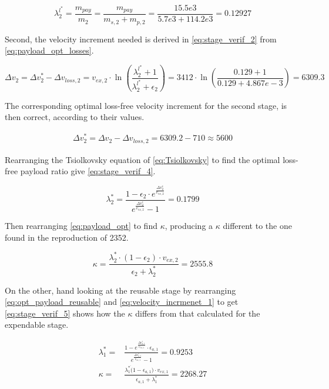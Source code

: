 \begin{equation}
    \lambda_2^{l^*} = \frac{m_{pay}}{m_2} = \frac{m_{pay}}{m_{s,2} + m_{p,2}} = \frac{15.5e3}{5.7e3 + 114.2e3} = 0.12927
\label{eq:stage_verif_1}
\end{equation}

Second, the velocity increment needed is derived in \autoref{eq:stage_verif_2} from \autoref{eq:payload_opt_losses}. 

\begin{equation}
    \Delta v_2 = \Delta v_2^* - \Delta v_{loss,2} = v_{ex,2} \cdot \ln(\frac{\lambda_2^{l^*}  + 1}{\lambda_2^{l^*}  + \epsilon_2}) = 3412 \cdot \ln(\frac{0.129 + 1}{0.129 + 4.867e-3}) = 6309.3
\label{eq:stage_verif_2}
\end{equation}

The corresponding optimal loss-free velocity increment for the second stage, is then correct, according to their values.

\begin{equation}
\begin{aligned}
    \Delta v_2^* =  \Delta v_2 - \Delta v_{loss,2} = 6309.2 - 710 \approx 5600
\end{aligned}
\label{eq:stage_verif_3}
\end{equation}

Rearranging the Tsiolkovsky equation of \autoref{eq:Tsiolkovsky} to find the optimal loss-free payload ratio give \autoref{eq:stage_verif_4}.

\begin{equation}
    \lambda_2^* = \frac{1 - \epsilon_2 \cdot e^{\frac{\Delta v^*_2}{v_{{ex,2}}}}}{e^{\frac{\Delta v^*_2}{v_{ex,2}}} - 1} = 0.1799
\label{eq:stage_verif_4}
\end{equation}

Then rearranging \autoref{eq:payload_opt} to find $\kappa$, producing a $\kappa$ different to the one found in the reproduction of 2352.

\begin{equation}
    \kappa = \frac{\lambda_2^* \cdot (1 - \epsilon_2) \cdot v_{ex,2}}{\epsilon_2 + \lambda_2^*} = 2555.8
\label{eq:stage_verif_5}
\end{equation}

On the other, hand looking at the reusable stage by rearranging \autoref{eq:opt_payload_reusable} and \autoref{eq:velocity_incrmenet_1} to get \autoref{eq:stage_verif_5} shows how the $\kappa$ differs from that calculated for the expendable stage.

\begin{equation}
\begin{aligned}
    \lambda_1^* =& \frac{1 - e^{\frac{\Delta v_{a,1}^*}{v_{ex,1}}} \cdot \epsilon_{a,1}}{e^{\frac{\Delta v_{a,1}^*}{v_{ex,1}}} - 1} = 0.9253 \\
    \kappa =& \frac{\lambda_1^* \dot (1 - \epsilon_{a,1}) \cdot v_{ex,1}}{\epsilon_{a,1} + \lambda_1^*} = 2268.27
\end{aligned}
\label{eq:stage_verif_5}
\end{equation}

